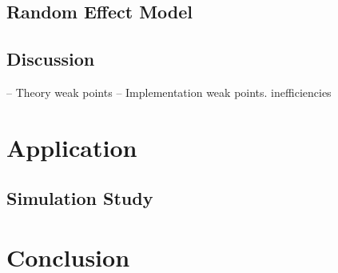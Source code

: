 \documentclass{article}
\begin{document}
    \subsection{Random Effect Model}



    \subsection{Discussion}
    -- Theory weak points
    -- Implementation weak points. inefficiencies



  \section{Application}

    \subsection{Simulation Study}

  \section{Conclusion}




  
  


  
\end{document}
